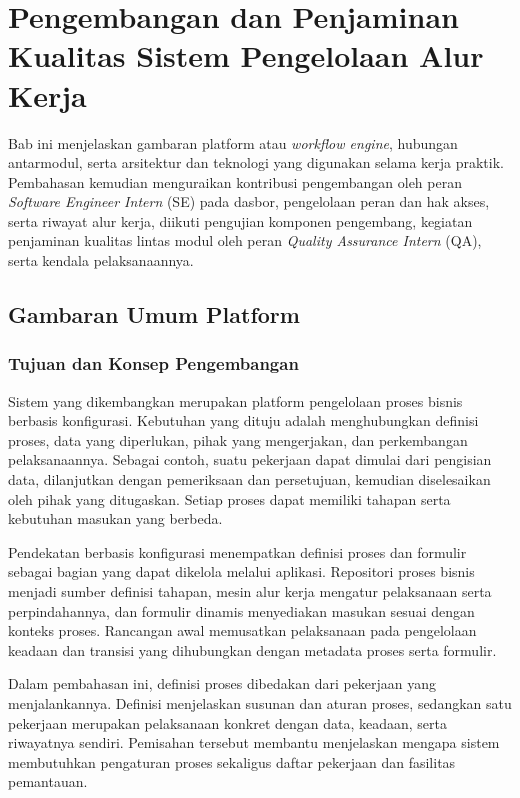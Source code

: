 \chapter{Pengembangan dan Penjaminan Kualitas Sistem Pengelolaan Alur Kerja}
Bab ini menjelaskan gambaran platform atau \textit{workflow engine}, hubungan antarmodul, serta arsitektur dan teknologi yang digunakan selama kerja praktik. Pembahasan kemudian menguraikan kontribusi pengembangan oleh peran \textit{Software Engineer Intern} (SE) pada dasbor, pengelolaan peran dan hak akses, serta riwayat alur kerja, diikuti pengujian komponen pengembang, kegiatan penjaminan kualitas lintas modul oleh peran \textit{Quality Assurance Intern} (QA), serta kendala pelaksanaannya.

\section{Gambaran Umum Platform}\label{sec:gambaran-platform}
\subsection{Tujuan dan Konsep Pengembangan}
Sistem yang dikembangkan merupakan platform pengelolaan proses bisnis berbasis konfigurasi. Kebutuhan yang dituju adalah menghubungkan definisi proses, data yang diperlukan, pihak yang mengerjakan, dan perkembangan pelaksanaannya. Sebagai contoh, suatu pekerjaan dapat dimulai dari pengisian data, dilanjutkan dengan pemeriksaan dan persetujuan, kemudian diselesaikan oleh pihak yang ditugaskan. Setiap proses dapat memiliki tahapan serta kebutuhan masukan yang berbeda.

Pendekatan berbasis konfigurasi menempatkan definisi proses dan formulir sebagai bagian yang dapat dikelola melalui aplikasi. Repositori proses bisnis menjadi sumber definisi tahapan, mesin alur kerja mengatur pelaksanaan serta perpindahannya, dan formulir dinamis menyediakan masukan sesuai dengan konteks proses. Rancangan awal memusatkan pelaksanaan pada pengelolaan keadaan dan transisi yang dihubungkan dengan metadata proses serta formulir.

Dalam pembahasan ini, definisi proses dibedakan dari pekerjaan yang menjalankannya. Definisi menjelaskan susunan dan aturan proses, sedangkan satu pekerjaan merupakan pelaksanaan konkret dengan data, keadaan, serta riwayatnya sendiri. Pemisahan tersebut membantu menjelaskan mengapa sistem membutuhkan pengaturan proses sekaligus daftar pekerjaan dan fasilitas pemantauan.

